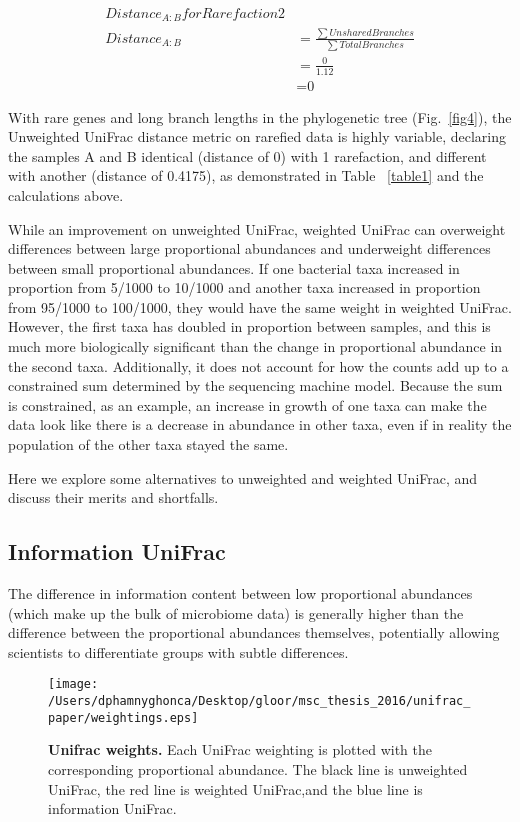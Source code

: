 \documentclass[10pt,letterpaper]{article}
\begin{document}
\begin{align*}
Distance_{A:B} for Rarefaction 2 &\\
Distance_{A:B} &=\frac{\sum Unshared Branches}{\sum Total Branches}\\
&= \frac{\text{0}}{\text{1.12}}\\ 
&= \text{0}
\end{align*}

With rare genes and long branch lengths in the phylogenetic tree (Fig.~\ref{fig4}), the Unweighted UniFrac distance metric on rarefied data is highly variable, declaring the samples A and B identical (distance of 0) with 1 rarefaction, and different with another (distance of 0.4175), as demonstrated in Table ~\ref{table1} and the calculations above.

While an improvement on unweighted UniFrac, weighted UniFrac can overweight differences between large proportional abundances and underweight differences between small proportional abundances. If one bacterial taxa increased in proportion from 5/1000 to 10/1000 and another taxa increased in proportion from 95/1000 to 100/1000, they would have the same weight in weighted UniFrac. However, the first taxa has doubled in proportion between samples, and this is much more biologically significant than the change in proportional abundance in the second taxa. Additionally, it does not account for how the counts add up to a constrained sum determined by the sequencing machine model. Because the sum is constrained, as an example, an increase in growth of one taxa can make the data look like there is a decrease in abundance in other taxa, even if in reality the population of the other taxa stayed the same.

Here we explore some alternatives to unweighted and weighted UniFrac, and discuss their merits and shortfalls.

\subsection{Information UniFrac}

The difference in information content between low proportional abundances (which make up the bulk of microbiome data) is generally higher than the difference between the proportional abundances themselves, potentially allowing scientists to differentiate groups with subtle differences.

\begin{figure}[h]
\texttt{[image: /Users/dphamnyghonca/Desktop/gloor/msc\_thesis\_2016/unifrac\_paper/weightings.eps]}
\caption{{\bf Unifrac weights. }
Each UniFrac weighting is plotted with the corresponding proportional abundance. The black line is unweighted UniFrac, the red line is weighted UniFrac,and  the blue line is information UniFrac. }
\label{fig5}
\end{figure}
\end{document}
